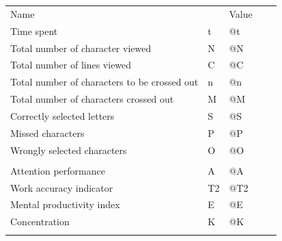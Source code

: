\documentclass[12pt,a4paper]{article}
\begin{document}
\section*{}
\begin{table}[]
\begin{tabular}{lllll}
\cline{1-3}
\multicolumn{1}{|l|}{Name} & \multicolumn{1}{l|}{} & \multicolumn{1}{l|}{Value} &  &  \\ \cline{1-3}
\multicolumn{1}{|l|}{Time spent} & \multicolumn{1}{l|}{t} & \multicolumn{1}{l|}{@t} &  &  \\ \cline{1-3}
\multicolumn{1}{|l|}{Total number of character viewed} & \multicolumn{1}{l|}{N} & \multicolumn{1}{l|}{@N} &  &  \\ \cline{1-3}
\multicolumn{1}{|l|}{Total number of lines viewed} & \multicolumn{1}{l|}{C} & \multicolumn{1}{l|}{@C} &  &  \\ \cline{1-3}
\multicolumn{1}{|l|}{Total number of characters to be crossed out} & \multicolumn{1}{l|}{n} & \multicolumn{1}{l|}{@n} &  &  \\ \cline{1-3}
\multicolumn{1}{|l|}{Total number of characters crossed out} & \multicolumn{1}{l|}{M} & \multicolumn{1}{l|}{@M} &  &  \\ \cline{1-3}
\multicolumn{1}{|l|}{Correctly selected letters} & \multicolumn{1}{l|}{S} & \multicolumn{1}{l|}{@S} &  &  \\ \cline{1-3}
\multicolumn{1}{|l|}{Missed characters} & \multicolumn{1}{l|}{P} & \multicolumn{1}{l|}{@P} &  &  \\ \cline{1-3}
\multicolumn{1}{|l|}{Wrongly selected characters} & \multicolumn{1}{l|}{O} & \multicolumn{1}{l|}{@O} &  &  \\ \cline{1-3}
\multicolumn{1}{|l|}{} & \multicolumn{1}{l|}{} & \multicolumn{1}{l|}{} &  &  \\ \cline{1-3}
\multicolumn{1}{|l|}{Attention performance} & \multicolumn{1}{l|}{A} & \multicolumn{1}{l|}{@A} &  &  \\ \cline{1-3}
\multicolumn{1}{|l|}{Work accuracy indicator} & \multicolumn{1}{l|}{T2} & \multicolumn{1}{l|}{@T2} &  &  \\ \cline{1-3}
\multicolumn{1}{|l|}{Mental productivity index} & \multicolumn{1}{l|}{E} & \multicolumn{1}{l|}{@E} &  &  \\ \cline{1-3}
\multicolumn{1}{|l|}{Concentration} & \multicolumn{1}{l|}{K} & \multicolumn{1}{l|}{@K} &  &  \\ \cline{1-3}
                       &                       &                       &  & 
\end{tabular}
\end{table}
\end{document}
